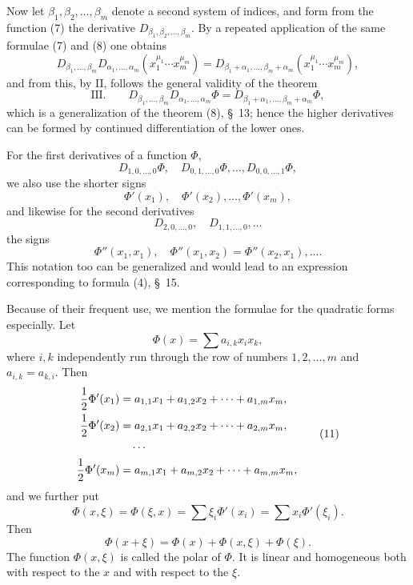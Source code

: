 \documentclass[11pt]{article}
\begin{document}
Now let $\beta_1,\beta_2,\ldots,\beta_m$ denote a second system of indices, and form from the function (7) the derivative $D_{\beta_1,\beta_2,\ldots,\beta_m}$. By a repeated application of the same formulae (7) and (8) one obtains
\begin{equation}
 D_{\beta_1,\ldots,\beta_m}D_{\alpha_1,\ldots,\alpha_m}
 (x_1^{\mu_1}\cdots x_m^{\mu_m})
 =
 D_{\beta_1+\alpha_1,\ldots,\beta_m+\alpha_m}
 (x_1^{\mu_1}\cdots x_m^{\mu_m}),
\tag{9}
\end{equation}
and from this, by II, follows the general validity of the theorem
\[
\text{III.}\qquad
D_{\beta_1,\ldots,\beta_m}D_{\alpha_1,\ldots,\alpha_m}\Phi
 =
D_{\beta_1+\alpha_1,\ldots,\beta_m+\alpha_m}\Phi,
\]
which is a generalization of the theorem (8), \S~13; hence the higher derivatives can be formed by continued differentiation of the lower ones.

For the first derivatives of a function $\Phi$,
\[
D_{1,0,\ldots,0}\Phi,\quad D_{0,1,\ldots,0}\Phi,\ldots,D_{0,0,\ldots,1}\Phi,
\]
we also use the shorter signs
\[
\Phi'(x_1),\quad \Phi'(x_2),\ldots,\Phi'(x_m),
\]
and likewise for the second derivatives
\[
D_{2,0,\ldots,0},\quad D_{1,1,\ldots,0},\ldots
\]
the signs
\[
\Phi''(x_1,x_1),\quad \Phi''(x_1,x_2)=\Phi''(x_2,x_1),\ldots.
\]
This notation too can be generalized and would lead to an expression corresponding to formula (4), \S~15.

Because of their frequent use, we mention the formulae for the quadratic forms especially. Let
\begin{equation}
 \Phi(x)=\sum a_{i,k}x_i x_k,
\tag{10}
\end{equation}
where $i,k$ independently run through the row of numbers $1,2,\ldots,m$ and $a_{i,k}=a_{k,i}$. Then
\begin{equation}
\begin{aligned}
 {1\over2}\Phi'(x_1)&=a_{1,1}x_1+a_{1,2}x_2+\cdots+a_{1,m}x_m,\\
 {1\over2}\Phi'(x_2)&=a_{2,1}x_1+a_{2,2}x_2+\cdots+a_{2,m}x_m,\\
 &\quad\cdots\\
 {1\over2}\Phi'(x_m)&=a_{m,1}x_1+a_{m,2}x_2+\cdots+a_{m,m}x_m,
\end{aligned}
\tag{11}
\end{equation}
and we further put
\begin{equation}
 \Phi(x,\xi)=\Phi(\xi,x)=\sum \xi_i\Phi'(x_i)=\sum x_i\Phi'(\xi_i).
\tag{12}
\end{equation}
Then
\begin{equation}
 \Phi(x+\xi)=\Phi(x)+\Phi(x,\xi)+\Phi(\xi).
\tag{13}
\end{equation}
The function $\Phi(x,\xi)$ is called the polar of $\Phi$. It is linear and homogeneous both with respect to the $x$ and with respect to the $\xi$.
\end{document}
